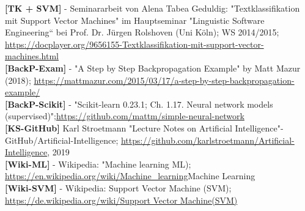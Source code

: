 \documentclass[12pt]{article}
\begin{document}
%
\textbf{[TK + SVM]} - Seminararbeit von Alena Tabea Geduldig: "Textklassifikation mit Support Vector Machines" im  Hauptseminar "Linguistic Software Engineering“ bei Prof. Dr. Jürgen Rolshoven (Uni Köln); WS 2014/2015; \url{https://docplayer.org/9656155-Textklassifikation-mit-support-vector-machines.html}\\[0.2cm] 
%
\textbf{[BackP-Exam]} - "A Step by Step Backpropagation Example" by Matt Mazur (2018); \url{https://mattmazur.com/2015/03/17/a-step-by-step-backpropagation-example/}\\[0.2cm] 
%
\textbf{[BackP-Scikit]} - "Scikit-learn 0.23.1; Ch. 1.17. Neural network models (supervised)";\url{https://github.com/mattm/simple-neural-network}\\[0.2cm] 
%
\textbf{[KS-GitHub]} Karl Stroetmann "Lecture Notes on Artificial Intelligence"-  GitHub/Artificial-Intelligence; \url{https://github.com/karlstroetmann/Artificial-Intelligence}, 2019\\[0.2cm]  
%
\textbf{[Wiki-ML]} - Wikipedia: "Machine learning ML); \url{https://en.wikipedia.org/wiki/Machine_learning}{Machine Learning}\\[0.2cm] 
%
\textbf{[Wiki-SVM]} - Wikipedia: Support Vector Machine (SVM); \url{https://de.wikipedia.org/wiki/Support Vector Machine(SVM)} \\[0.2cm] 
\end{document}

